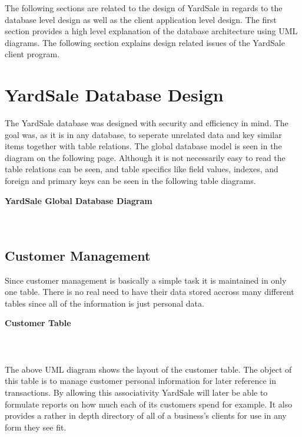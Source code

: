 \documentclass{report}
\begin{document}
    The following sections are related to the design of YardSale
    in regards to the database level design as well as the client
    application level design. The first section provides a high level
    explanation of the database architecture using UML diagrams. The
    following section explains design related issues of the YardSale
    client program.

\section{YardSale Database Design}

    The YardSale database was designed with security and efficiency in
    mind. The goal was, as it is in any database, to seperate unrelated
    data and key similar items together with table relations. The global
    database model is seen in the diagram on the following page. Although
    it is not necessarily easy to read the table relations can be seen, and
    table specifics like field values, indexes, and foreign and primary keys
    can be seen in the following table diagrams.

    \newpage

    {\bf YardSale Global Database Diagram}\\
    \\
    \\

    \newpage

    \subsection{Customer Management}

    Since customer management is basically a simple task it is maintained in only
    one table. There is no real need to have their data stored accross many
    different tables since all of the information is just personal data.

    {\bf Customer Table}\\
    \\
    \\
    \\
    The above UML diagram shows the layout of the customer table. The object of this
    table is to manage customer personal information for later reference in
    transactions. By allowing this associativity YardSale will later be able to
    formulate reports on how much each of its customers spend for example. It also
    provides a rather in depth directory of all of a business's clients for use
    in any form they see fit.
\end{document}
